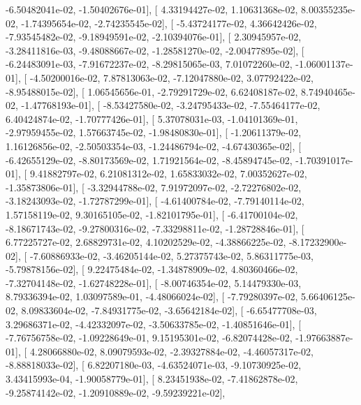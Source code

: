 \documentclass{article}
\begin{document}
         -6.50482041e-02,  -1.50402676e-01],
       [  4.33194427e-02,   1.10631368e-02,   8.00355235e-02,
         -1.74395654e-02,  -2.74235545e-02],
       [ -5.43724177e-02,   4.36642426e-02,  -7.93545482e-02,
         -9.18949591e-02,  -2.10394076e-01],
       [  2.30945957e-02,  -3.28411816e-03,  -9.48088667e-02,
         -1.28581270e-02,  -2.00477895e-02],
       [ -6.24483091e-03,  -7.91672237e-02,  -8.29815065e-03,
          7.01072260e-02,  -1.06001137e-01],
       [ -4.50200016e-02,   7.87813063e-02,  -7.12047880e-02,
          3.07792422e-02,  -8.95488015e-02],
       [  1.06545656e-01,  -2.79291729e-02,   6.62408187e-02,
          8.74940465e-02,  -1.47768193e-01],
       [ -8.53427580e-02,  -3.24795433e-02,  -7.55464177e-02,
          6.40424874e-02,  -1.70777426e-01],
       [  5.37078031e-03,  -1.04101369e-01,  -2.97959455e-02,
          1.57663745e-02,  -1.98480830e-01],
       [ -1.20611379e-02,   1.16126856e-02,  -2.50503354e-03,
         -1.24486794e-02,  -4.67430365e-02],
       [ -6.42655129e-02,  -8.80173569e-02,   1.71921564e-02,
         -8.45894745e-02,  -1.70391017e-01],
       [  9.41882797e-02,   6.21081312e-02,   1.65833032e-02,
          7.00352627e-02,  -1.35873806e-01],
       [ -3.32944788e-02,   7.91972097e-02,  -2.72276802e-02,
         -3.18243093e-02,  -1.72787299e-01],
       [ -4.61400784e-02,  -7.79140114e-02,   1.57158119e-02,
          9.30165105e-02,  -1.82101795e-01],
       [ -6.41700104e-02,  -8.18671743e-02,  -9.27800316e-02,
         -7.33298811e-02,  -1.28728846e-01],
       [  6.77225727e-02,   2.68829731e-02,   4.10202529e-02,
         -4.38866225e-02,  -8.17232900e-02],
       [ -7.60886933e-02,  -3.46205144e-02,   5.27375743e-02,
          5.86311775e-03,  -5.79878156e-02],
       [  9.22475484e-02,  -1.34878909e-02,   4.80360466e-02,
         -7.32704148e-02,  -1.62748228e-01],
       [ -8.00746354e-02,   5.14479330e-03,   8.79336394e-02,
          1.03097589e-01,  -4.48066024e-02],
       [ -7.79280397e-02,   5.66406125e-02,   8.09833604e-02,
         -7.84931775e-02,  -3.65642184e-02],
       [ -6.65477708e-03,   3.29686371e-02,  -4.42332097e-02,
         -3.50633785e-02,  -1.40851646e-01],
       [ -7.76756758e-02,  -1.09228649e-01,   9.15195301e-02,
         -6.82074428e-02,  -1.97663887e-01],
       [  4.28066880e-02,   8.09079593e-02,  -2.39327884e-02,
         -4.46057317e-02,  -8.88818033e-02],
       [  6.82207180e-03,  -4.63524071e-03,  -9.10730925e-02,
          3.43415993e-04,  -1.90058779e-01],
       [  8.23451938e-02,  -7.41862878e-02,  -9.25874142e-02,
         -1.20910889e-02,  -9.59239221e-02],
\end{document}
